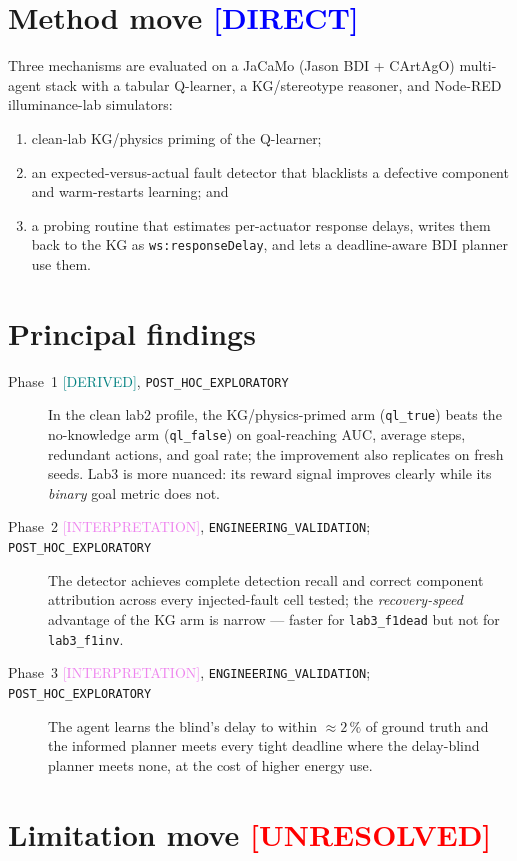 \documentclass[12pt, a4paper, oneside]{memoir}
\newcommand{\evDirect}{\textcolor{blue}{[DIRECT]}}
\newcommand{\evDerived}{\textcolor{teal}{[DERIVED]}}
\newcommand{\evInterp}{\textcolor{violet}{[INTERPRETATION]}}
\newcommand{\evUnresolved}{\textcolor{red}{[UNRESOLVED]}}
\newcommand{\rsPHE}{\texttt{POST\_HOC\_EXPLORATORY}}
\newcommand{\rsEV}{\texttt{ENGINEERING\_VALIDATION}}
\newcommand{\qlT}{\texttt{ql\_true}}
\newcommand{\qlF}{\texttt{ql\_false}}
\newcommand{\wsRD}{\texttt{ws:responseDelay}}
\begin{document}
\section{Method move \evDirect}

Three mechanisms are evaluated on a JaCaMo (Jason BDI + CArtAgO) multi-agent
stack with a tabular Q-learner, a KG/stereotype reasoner, and Node-RED
illuminance-lab simulators:
\begin{enumerate}
  \item clean-lab KG/physics priming of the Q-learner;
  \item an expected-versus-actual fault detector that blacklists a defective
        component and warm-restarts learning; and
  \item a probing routine that estimates per-actuator response delays, writes
        them back to the KG as \wsRD, and lets a deadline-aware BDI planner
        use them.
\end{enumerate}

\section{Principal findings}

\begin{description}
  \item[Phase~1 \evDerived, \rsPHE]
    In the clean lab2 profile, the KG/physics-primed arm (\qlT) beats the
    no-knowledge arm (\qlF) on goal-reaching AUC, average steps, redundant
    actions, and goal rate; the improvement also replicates on fresh seeds.
    Lab3 is more nuanced: its reward signal improves clearly while its
    \emph{binary} goal metric does not.

  \item[Phase~2 \evInterp, \rsEV; \rsPHE]
    The detector achieves complete detection recall and correct component
    attribution across every injected-fault cell tested; the
    \emph{recovery-speed} advantage of the KG arm is narrow --- faster for
    \texttt{lab3\_f1dead} but not for \texttt{lab3\_f1inv}.

  \item[Phase~3 \evInterp, \rsEV; \rsPHE]
    The agent learns the blind's delay to within ${\approx}2\,\%$ of ground
    truth and the informed planner meets every tight deadline where the
    delay-blind planner meets none, at the cost of higher energy use.
\end{description}

\section{Limitation move \evUnresolved}
\end{document}
